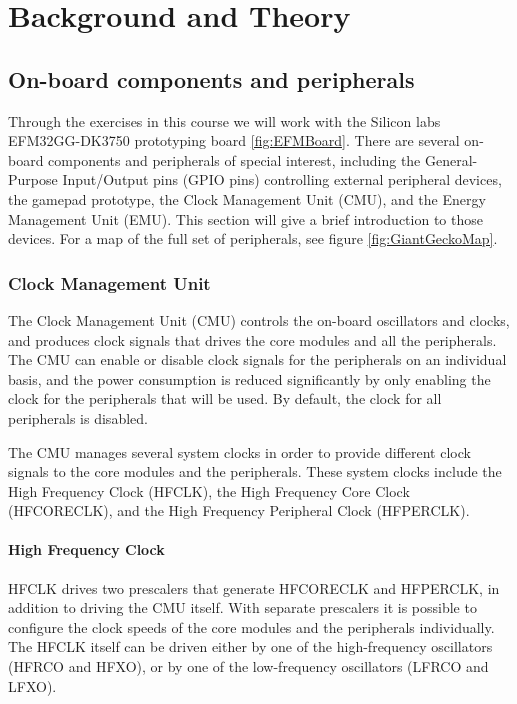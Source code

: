 \chapter{Background and Theory}


\section{On-board components and peripherals}
Through the exercises in this course we will work with the Silicon labs EFM32GG-DK3750 prototyping board \ref{fig:EFMBoard}. There are several on-board components and peripherals of special interest, including the General-Purpose Input/Output pins (GPIO pins) controlling external peripheral devices, the gamepad prototype, the Clock Management Unit (CMU), and the Energy Management Unit (EMU). This section will give a brief introduction to those devices. For a map of the full set of peripherals, see figure \ref{fig:GiantGeckoMap}.


\subsection{Clock Management Unit}\label{subsec:cmu}
The Clock Management Unit (CMU) controls the on-board oscillators and clocks, and produces clock signals that drives the core modules and all the peripherals. The CMU can enable or disable clock signals for the peripherals on an individual basis, and the power consumption is reduced significantly by only enabling the clock for the peripherals that will be used. By default, the clock for all peripherals is disabled. 

The CMU manages several system clocks in order to provide different clock signals to the core modules and the peripherals. These system clocks include the High Frequency Clock (HFCLK), the High Frequency Core Clock (HFCORECLK), and the High Frequency Peripheral Clock (HFPERCLK).\cite{efm32gg-rm}

\subsubsection{High Frequency Clock}
HFCLK drives two prescalers that generate HFCORECLK and HFPERCLK, in addition to driving the CMU itself. With separate prescalers it is possible to configure the clock speeds of the core modules and the peripherals individually. The HFCLK itself can be driven either by one of the high-frequency oscillators (HFRCO and HFXO), or by one of the low-frequency oscillators (LFRCO and LFXO). 

